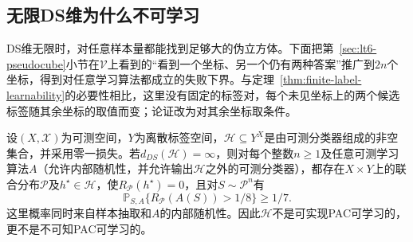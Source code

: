 \subsection{无限DS维为什么不可学习}
\label{sec:lt6-infinite-ds}

DS维无限时，对任意样本量都能找到足够大的伪立方体。下面把第~\ref{sec:lt6-pseudocube}小节在$\mathcal V$上看到的“看到一个坐标、另一个仍有两种答案”推广到$2n$个坐标，得到对任意学习算法都成立的失败下界。与定理~\ref{thm:finite-label-learnability}的必要性相比，这里没有固定的标签对，每个未见坐标上的两个候选标签随其余坐标的取值而变；论证改为对其余坐标取条件。

\begin{theorem}[无限DS维的不可学习性]
\label{thm:infinite-ds-lower-bound}
设$(X,\mathcal X)$为可测空间，$Y$为离散标签空间，$\mathcal H\subseteq Y^X$是由可测分类器组成的非空集合，并采用零一损失。若$d_{DS}(\mathcal H)=\infty$，则对每个整数$n\geq1$及任意可测学习算法$A$（允许内部随机性，并允许输出$\mathcal H$之外的可测分类器），都存在$X\times Y$上的联合分布$\mathcal P$及$h^\star\in\mathcal H$，使$R_{\mathcal P}(h^\star)=0$，且对$S\sim\mathcal P^n$有
\[
 \mathbb P_{S,A}\{R_{\mathcal P}(A(S))>1/8\}\geq1/7.
\]
这里概率同时来自样本抽取和$A$的内部随机性。因此$\mathcal H$不是可实现PAC可学习的，更不是不可知PAC可学习的。
\end{theorem}


